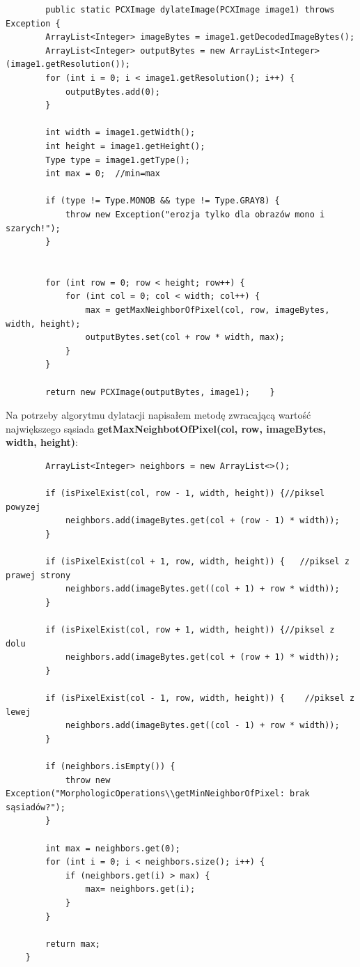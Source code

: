 \documentclass{article}
\begin{document}
	\begin{verbatim}
	    public static PCXImage dylateImage(PCXImage image1) throws Exception {
        ArrayList<Integer> imageBytes = image1.getDecodedImageBytes();
        ArrayList<Integer> outputBytes = new ArrayList<Integer>(image1.getResolution());
        for (int i = 0; i < image1.getResolution(); i++) {
            outputBytes.add(0);
        }

        int width = image1.getWidth();
        int height = image1.getHeight();
        Type type = image1.getType();
        int max = 0;  //min=max

        if (type != Type.MONOB && type != Type.GRAY8) {
            throw new Exception("erozja tylko dla obrazów mono i szarych!");
        }

     
        for (int row = 0; row < height; row++) {
            for (int col = 0; col < width; col++) {
                max = getMaxNeighborOfPixel(col, row, imageBytes, width, height);
                outputBytes.set(col + row * width, max);
            }
        }

        return new PCXImage(outputBytes, image1);    }
  \end{verbatim}

	Na potrzeby algorytmu dylatacji napisałem metodę zwracającą wartość największego sąsiada \textbf{getMaxNeighbotOfPixel(col, row, imageBytes, width, height)}:
	\begin{verbatim}
	    ArrayList<Integer> neighbors = new ArrayList<>();

        if (isPixelExist(col, row - 1, width, height)) {//piksel powyzej
            neighbors.add(imageBytes.get(col + (row - 1) * width));
        }

        if (isPixelExist(col + 1, row, width, height)) {   //piksel z prawej strony
            neighbors.add(imageBytes.get((col + 1) + row * width));
        }

        if (isPixelExist(col, row + 1, width, height)) {//piksel z dolu
            neighbors.add(imageBytes.get(col + (row + 1) * width));
        }

        if (isPixelExist(col - 1, row, width, height)) {    //piksel z lewej
            neighbors.add(imageBytes.get((col - 1) + row * width));
        }

        if (neighbors.isEmpty()) {
            throw new Exception("MorphologicOperations\\getMinNeighborOfPixel: brak sąsiadów?");
        }

        int max = neighbors.get(0);
        for (int i = 0; i < neighbors.size(); i++) {
            if (neighbors.get(i) > max) {
                max= neighbors.get(i);
            }
        }

        return max;
    }
	\end{verbatim}
	
\end{document}
